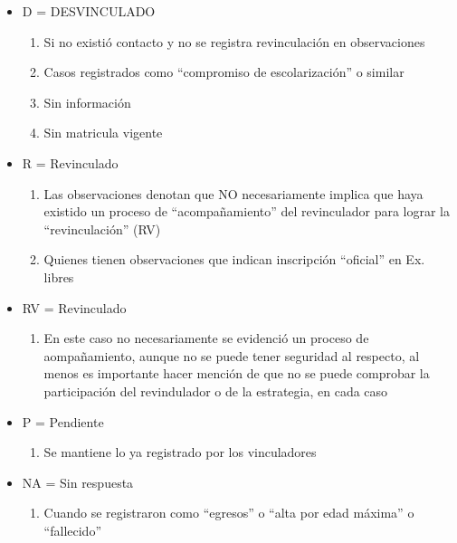 \documentclass[
]{article}
\providecommand{\tightlist}{%
  \setlength{\itemsep}{0pt}\setlength{\parskip}{0pt}}
\begin{document}
\begin{itemize}
\item
  D = DESVINCULADO

  \begin{enumerate}
  \def\labelenumi{\arabic{enumi}.}
  \tightlist
  \item
    Si no existió contacto y no se registra revinculación en
    observaciones
  \item
    Casos registrados como ``compromiso de escolarización'' o similar
  \item
    Sin información
  \item
    Sin matricula vigente
  \end{enumerate}
\item
  R = Revinculado

  \begin{enumerate}
  \def\labelenumi{\arabic{enumi}.}
  \tightlist
  \item
    Las observaciones denotan que NO necesariamente implica que haya
    existido un proceso de ``acompañamiento'' del revinculador para
    lograr la ``revinculación'' (RV)
  \item
    Quienes tienen observaciones que indican inscripción ``oficial'' en
    Ex. libres
  \end{enumerate}
\item
  RV = Revinculado

  \begin{enumerate}
  \def\labelenumi{\arabic{enumi}.}
  \tightlist
  \item
    En este caso no necesariamente se evidenció un proceso de
    aompañamiento, aunque no se puede tener seguridad al respecto, al
    menos es importante hacer mención de que no se puede comprobar la
    participación del revindulador o de la estrategia, en cada caso
  \end{enumerate}
\item
  P = Pendiente

  \begin{enumerate}
  \def\labelenumi{\arabic{enumi}.}
  \tightlist
  \item
    Se mantiene lo ya registrado por los vinculadores
  \end{enumerate}
\item
  NA = Sin respuesta

  \begin{enumerate}
  \def\labelenumi{\arabic{enumi}.}
  \tightlist
  \item
    Cuando se registraron como ``egresos'' o ``alta por edad máxima'' o
    ``fallecido''
  \end{enumerate}
\end{itemize}
\end{document}
